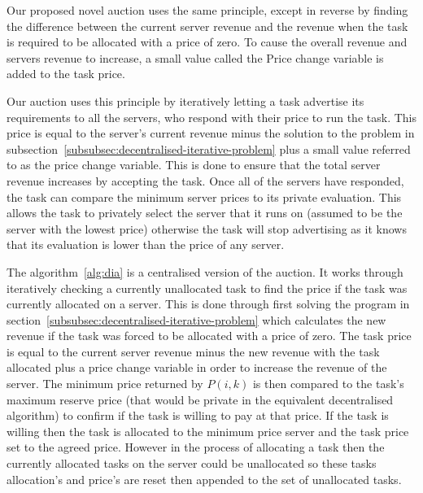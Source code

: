Our proposed novel auction uses the same principle, except in reverse by finding the difference between the current
server revenue and the revenue when the task is required to be allocated with a price of zero. To cause the overall
revenue and servers revenue to increase, a small value called the Price change variable is added to the task price.

Our auction uses this principle by iteratively letting a task advertise its requirements to all the servers, who
respond with their price to run the task. This price is equal to the server's current revenue minus the solution to the
problem in subsection~\ref{subsubsec:decentralised-iterative-problem} plus a small value referred to as the price change
variable. This is done to ensure that the total server revenue increases by accepting the task. Once all of the servers
have responded, the task can compare the minimum server prices to its private evaluation. This allows the task to
privately select the server that it runs on (assumed to be the server with the lowest price) otherwise the task will
stop advertising as it knows that its evaluation is lower than the price of any server.

The algorithm~\ref{alg:dia} is a centralised version of the auction. It works through iteratively checking a currently
unallocated task to find the price if the task was currently allocated on a server. This is done through first solving
the program in section~\ref{subsubsec:decentralised-iterative-problem} which calculates the new revenue if the task was
forced to be allocated with a price of zero. The task price is equal to the current server revenue minus the new
revenue with the task allocated plus a price change variable in order to increase the revenue of the server. The
minimum price returned by $P(i, k)$ is then compared to the task's maximum reserve price (that would be private in the
equivalent decentralised algorithm) to confirm if the task is willing to pay at that price. If the task is willing then
the task is allocated to the minimum price server and the task price set to the agreed price. However in the process of
allocating a task then the currently allocated tasks on the server could be unallocated so these tasks allocation's and
price's are reset then appended to the set of unallocated tasks.


